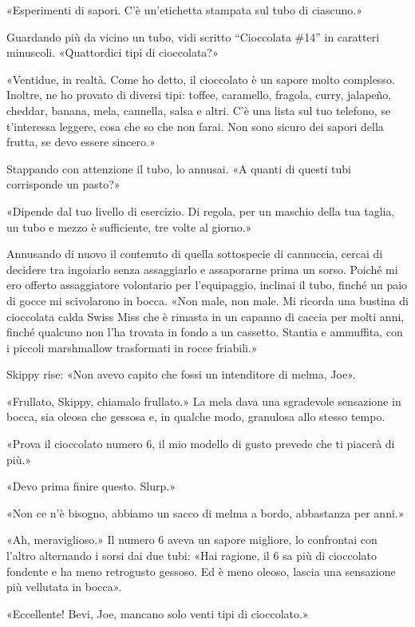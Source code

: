 «Esperimenti di sapori. C'è un'etichetta stampata sul tubo di ciascuno.»

Guardando più da vicino un tubo, vidi scritto ``Cioccolata \#14'' in
caratteri minuscoli. «Quattordici tipi di cioccolata?»

«Ventidue, in realtà. Come ho detto, il cioccolato è un sapore molto
complesso. Inoltre, ne ho provato di diversi tipi: toffee, caramello,
fragola, curry, jalapeño, cheddar, banana, mela, cannella, salsa e
altri. C'è una lista sul tuo telefono, se t'interessa leggere, cosa che
so che non farai. Non sono sicuro dei sapori della frutta, se devo
essere sincero.»

Stappando con attenzione il tubo, lo annusai. «A quanti di questi tubi
corrisponde un pasto?»

«Dipende dal tuo livello di esercizio. Di regola, per un maschio della
tua taglia, un tubo e mezzo è sufficiente, tre volte al giorno.»

Annusando di nuovo il contenuto di quella sottospecie di cannuccia,
cercai di decidere tra ingoiarlo senza assaggiarlo e assaporarne prima
un sorso. Poiché mi ero offerto assaggiatore volontario per
l'equipaggio, inclinai il tubo, finché un paio di gocce mi scivolarono
in bocca. «Non male, non male. Mi ricorda una bustina di cioccolata
calda Swiss Miss che è rimasta in un capanno di caccia per molti anni,
finché qualcuno non l'ha trovata in fondo a un cassetto. Stantia e
ammuffita, con i piccoli marshmallow trasformati in rocce friabili.»

Skippy rise: «Non avevo capito che fossi un intenditore di melma, Joe».

«Frullato, Skippy, chiamalo frullato.» La mela dava una sgradevole
sensazione in bocca, sia oleosa che gessosa e, in qualche modo,
granulosa allo stesso tempo.

«Prova il cioccolato numero 6, il mio modello di gusto prevede che ti
piacerà di più.»

«Devo prima finire questo. Slurp.»

«Non ce n'è bisogno, abbiamo un sacco di melma a bordo, abbastanza per
anni.»

«Ah, meraviglioso.» Il numero 6 aveva un sapore migliore, lo confrontai
con l'altro alternando i sorsi dai due tubi: «Hai ragione, il 6 sa più
di cioccolato fondente e ha meno retrogusto gessoso. Ed è meno oleoso,
lascia una sensazione più vellutata in bocca».

«Eccellente! Bevi, Joe, mancano solo venti tipi di cioccolato.»

